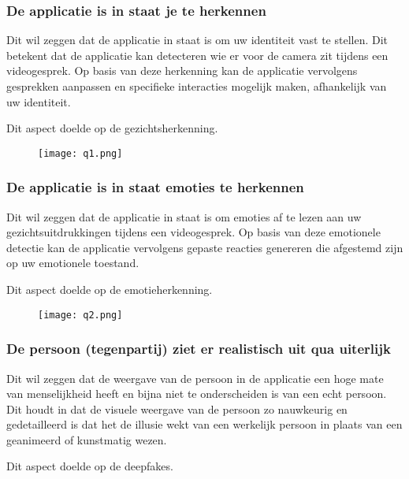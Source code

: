 \subsubsection{De applicatie is in staat je te herkennen}

Dit wil zeggen dat de applicatie in staat is om uw identiteit vast te stellen. Dit betekent dat de applicatie kan detecteren wie er voor de camera zit tijdens een videogesprek. Op basis van deze herkenning kan de applicatie vervolgens gesprekken aanpassen en specifieke interacties mogelijk maken, afhankelijk van uw identiteit.

Dit aspect doelde op de gezichtsherkenning.

\begin{figure}[htbp]
    \centering
    \texttt{[image: q1.png]}
    \label{fig:vraag_1_resultaat}
\end{figure}

\subsubsection{De applicatie is in staat emoties te herkennen}

Dit wil zeggen  dat de applicatie in staat is om emoties af te lezen aan uw gezichtsuitdrukkingen tijdens een videogesprek. Op basis van deze emotionele detectie kan de applicatie vervolgens gepaste reacties genereren die afgestemd zijn op uw emotionele toestand.

Dit aspect doelde op de emotieherkenning.

\begin{figure}[htbp]
    \centering
    \texttt{[image: q2.png]}
    \label{fig:vraag_2_resultaat}
\end{figure}

\subsubsection{De persoon (tegenpartij) ziet er realistisch uit qua uiterlijk}

Dit wil zeggen dat de weergave van de persoon in de applicatie een hoge mate van menselijkheid heeft en bijna niet te onderscheiden is van een echt persoon. Dit houdt in dat de visuele weergave van de persoon zo nauwkeurig en gedetailleerd is dat het de illusie wekt van een werkelijk persoon in plaats van een geanimeerd of kunstmatig wezen.

Dit aspect doelde op de deepfakes.

